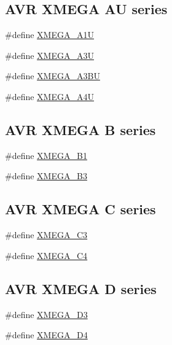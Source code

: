 \subsection*{A\-V\-R X\-M\-E\-G\-A A\-U series}
\begin{DoxyCompactItemize}
\item 
\#define \hyperlink{group__xmega__part__macros__group_ga6672329ddee03af905aa378946568b67}{X\-M\-E\-G\-A\-\_\-\-A1\-U}
\item 
\#define \hyperlink{group__xmega__part__macros__group_gab5232598231cc5c17658e4b7cc5293ec}{X\-M\-E\-G\-A\-\_\-\-A3\-U}
\item 
\#define \hyperlink{group__xmega__part__macros__group_ga98083f3307fe61cc2377948db87cd708}{X\-M\-E\-G\-A\-\_\-\-A3\-B\-U}
\item 
\#define \hyperlink{group__xmega__part__macros__group_ga7625edcdd219df905c870d73c1689da6}{X\-M\-E\-G\-A\-\_\-\-A4\-U}
\end{DoxyCompactItemize}
\subsection*{A\-V\-R X\-M\-E\-G\-A B series}
\begin{DoxyCompactItemize}
\item 
\#define \hyperlink{group__xmega__part__macros__group_gaa2fd55860a1bbc05c6d0d384e7476596}{X\-M\-E\-G\-A\-\_\-\-B1}
\item 
\#define \hyperlink{group__xmega__part__macros__group_ga7385be70af05a3a61864a4fc470fa39d}{X\-M\-E\-G\-A\-\_\-\-B3}
\end{DoxyCompactItemize}
\subsection*{A\-V\-R X\-M\-E\-G\-A C series}
\begin{DoxyCompactItemize}
\item 
\#define \hyperlink{group__xmega__part__macros__group_ga10c26d10c3df7d9874e4527d1327c60b}{X\-M\-E\-G\-A\-\_\-\-C3}
\item 
\#define \hyperlink{group__xmega__part__macros__group_ga8add217f9d3d28fda40ec91e65a5d970}{X\-M\-E\-G\-A\-\_\-\-C4}
\end{DoxyCompactItemize}
\subsection*{A\-V\-R X\-M\-E\-G\-A D series}
\begin{DoxyCompactItemize}
\item 
\#define \hyperlink{group__xmega__part__macros__group_gad634208a506f79622c67be500014feb3}{X\-M\-E\-G\-A\-\_\-\-D3}
\item 
\#define \hyperlink{group__xmega__part__macros__group_ga831e633408c7458a445d333b9b3f142f}{X\-M\-E\-G\-A\-\_\-\-D4}
\end{DoxyCompactItemize}
